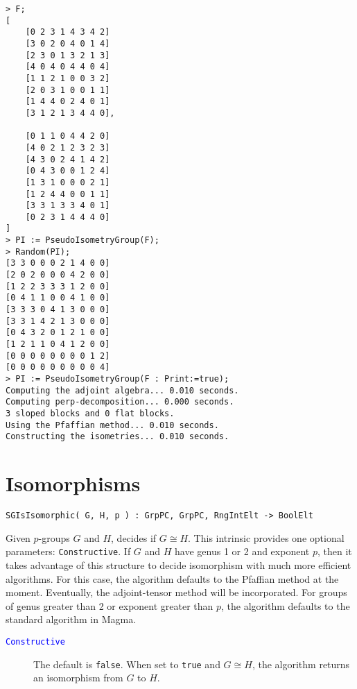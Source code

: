 \documentclass{amsart}
\begin{document}
\begin{lstlisting}[frame=single,basicstyle=\ttfamily\color{black!30!teal},backgroundcolor=\color{white!70!gray}]
> F;
[
    [0 2 3 1 4 3 4 2]
    [3 0 2 0 4 0 1 4]
    [2 3 0 1 3 2 1 3]
    [4 0 4 0 4 4 0 4]
    [1 1 2 1 0 0 3 2]
    [2 0 3 1 0 0 1 1]
    [1 4 4 0 2 4 0 1]
    [3 1 2 1 3 4 4 0],

    [0 1 1 0 4 4 2 0]
    [4 0 2 1 2 3 2 3]
    [4 3 0 2 4 1 4 2]
    [0 4 3 0 0 1 2 4]
    [1 3 1 0 0 0 2 1]
    [1 2 4 4 0 0 1 1]
    [3 3 1 3 3 4 0 1]
    [0 2 3 1 4 4 4 0]
]
> PI := PseudoIsometryGroup(F);
> Random(PI);
[3 3 0 0 0 2 1 4 0 0]
[2 0 2 0 0 0 4 2 0 0]
[1 2 2 3 3 3 1 2 0 0]
[0 4 1 1 0 0 4 1 0 0]
[3 3 3 0 4 1 3 0 0 0]
[3 3 1 4 2 1 3 0 0 0]
[0 4 3 2 0 1 2 1 0 0]
[1 2 1 1 0 4 1 2 0 0]
[0 0 0 0 0 0 0 0 1 2]
[0 0 0 0 0 0 0 0 0 4]
> PI := PseudoIsometryGroup(F : Print:=true);
Computing the adjoint algebra... 0.010 seconds.
Computing perp-decomposition... 0.000 seconds.
3 sloped blocks and 0 flat blocks.
Using the Pfaffian method... 0.010 seconds.
Constructing the isometries... 0.010 seconds.
\end{lstlisting}

\color{black}
\section{Isomorphisms}

\color{blue}
\begin{verbatim}
SGIsIsomorphic( G, H, p ) : GrpPC, GrpPC, RngIntElt -> BoolElt
\end{verbatim}

\color{black}
Given $p$-groups $G$ and $H$, decides if $G\cong H$.
This intrinsic provides one optional parameters: {\tt Constructive}. 
If $G$ and $H$ have genus 1 or 2 and exponent $p$, then it takes advantage of this structure 
to decide isomorphism with much more efficient algorithms. 
For this case, the algorithm defaults to the Pfaffian method at the moment. 
Eventually, the adjoint-tensor method will be incorporated.
For groups of genus greater than 2 or exponent greater than $p$, the algorithm defaults to the standard algorithm in {\sc Magma}.

\begin{description}
\item[\textcolor{blue}{\tt Constructive}]
The default is {\tt false}. 
When set to {\tt true} and $G\cong H$, the algorithm returns an isomorphism from $G$ to $H$.
\end{description}
\end{document}
